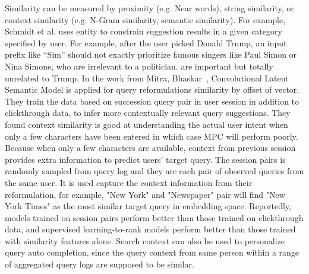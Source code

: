 \documentclass[12pt]{article} %
\begin{document}
Similarity can be measured by proximity (e.g. Near words), string similarity, or context similarity (e.g. N-Gram similarity, semantic similarity).
For example, Schmidt et al. \cite{schmidt_context_sensitive_2016} uses entity to constrain suggestion results in a given category specified by user. 
For example, after the user picked Donald Trump, an input prefix like “Sim” should not exactly prioritize famous singers like Paul Simon or Nina Simone, who are irrelevant to a politician.
are important but totally unrelated to Trump. 
In the work from Mitra, Bhaskar~\cite{mitra_exploring_2015}, Convolutional Latent Semantic Model is applied for query reformulations similarity by offset of vector.
They train the data based on succession query pair in user session in addition to clickthrough data,
to infer more contextually relevant query suggestions.
They found context similarity is good at understanding the actual user intent when only a few characters have been entered in which case MPC will perform poorly.
Because when only a few characters are available, context from previous session provides extra information to predict users' target query.
The session pairs is randomly sampled from query log and they are each pair of observed queries from the same user.
It is used capture the context information from their reformulation, for example, "New York" and "Newspaper" pair will find "New York Times" as the most similar target query in embedding space. 
Reportedly, models trained on session pairs perform better than those trained on clickthrough data, and supervised learning-to-rank models perform better than
those trained with similarity features alone.
Search context can also be used to personalize query auto completion, since the query context from same person within a range of aggregated query logs are supposed to be similar.
\end{document}
